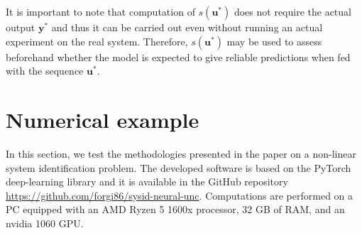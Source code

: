 \documentclass{article}
\newcommand{\tvec}[1]{{\mathbf{#1}}}
\begin{document}
It is important to note that computation of $s(\tvec{u}^*)$ does not require the actual output $\tvec{y}^*$ and thus it can be carried out even without running an actual experiment on the real system.
Therefore, $s(\tvec{u}^*)$ may be used to assess beforehand whether the model is expected to give reliable predictions when fed with the sequence $\tvec{u}^*$.


\section{Numerical example}
In this section, we test the methodologies presented in the paper on a non-linear system identification problem. %
The developed software is based on the PyTorch deep-learning library and it is available in the GitHub repository \url{https://github.com/forgi86/sysid-neural-unc}.
Computations are performed on a PC equipped with an AMD Ryzen 5 1600x processor, 32 GB of RAM, and an nvidia 1060 GPU.
\end{document}
